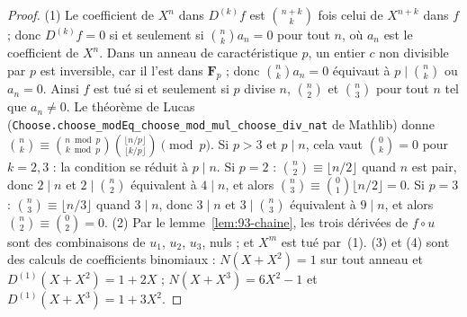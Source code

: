 \begin{proof}
(1) Le coefficient de $X^n$ dans $D^{(k)} f$ est $\binom{n+k}{k}$ fois celui de $X^{n+k}$ dans $f$ ; donc $D^{(k)} f = 0$ si et seulement si $\binom nk a_n = 0$ pour tout $n$, où $a_n$ est le coefficient de $X^n$. Dans un anneau de caractéristique $p$, un entier $c$ non divisible par $p$ est inversible, car il l'est dans $\mathbf F_p$ ; donc $\binom nk a_n = 0$ équivaut à $p \mid \binom nk$ ou $a_n = 0$. Ainsi $f$ est tué si et seulement si $p$ divise $n$, $\binom n2$ et $\binom n3$ pour tout $n$ tel que $a_n \neq 0$. Le théorème de Lucas (\texttt{Choose.\allowbreak{}choose\_modEq\_choose\_mod\_mul\_choose\_div\_nat} de Mathlib) donne $\binom nk \equiv \binom{n \bmod p}{k \bmod p}\binom{\lfloor n/p\rfloor}{\lfloor k/p\rfloor} \pmod p$. Si $p > 3$ et $p \mid n$, cela vaut $\binom 0k = 0$ pour $k = 2, 3$ : la condition se réduit à $p \mid n$. Si $p = 2$ : $\binom n2 \equiv \lfloor n/2\rfloor$ quand $n$ est pair, donc $2 \mid n$ et $2 \mid \binom n2$ équivalent à $4 \mid n$, et alors $\binom n3 \equiv \binom 01 \lfloor n/2 \rfloor = 0$. Si $p = 3$ : $\binom n3 \equiv \lfloor n/3\rfloor$ quand $3 \mid n$, donc $3 \mid n$ et $3 \mid \binom n3$ équivalent à $9 \mid n$, et alors $\binom n2 \equiv \binom 02 = 0$. (2) Par le lemme~\ref{lem:93-chaine}, les trois dérivées de $f \circ u$ sont des combinaisons de $u_1$, $u_2$, $u_3$, nuls ; et $X^m$ est tué par~(1). (3) et (4) sont des calculs de coefficients binomiaux : $N(X + X^2) = 1$ sur tout anneau et $D^{(1)}(X + X^2) = 1 + 2X$ ; $N(X + X^3) = 6X^2 - 1$ et $D^{(1)}(X + X^3) = 1 + 3X^2$.
\end{proof}

